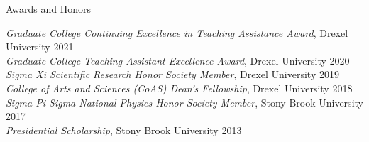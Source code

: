 \documentclass{resume} %
\begin{document}

\begin{rSection}{Awards and Honors}

\textit{Graduate College Continuing Excellence in Teaching Assistance Award}, Drexel University \hfill{2021} \\
\textit{Graduate College Teaching Assistant Excellence Award}, Drexel University \hfill{2020} \\
\textit{Sigma Xi Scientific Research Honor Society Member}, Drexel University \hfill{2019}\\
\textit{College of Arts and Sciences (CoAS) Dean's Fellowship}, Drexel University \hfill {2018}\\
\textit{Sigma Pi Sigma National Physics Honor Society Member}, Stony Brook University \hfill{2017}\\
\textit{Presidential Scholarship}, Stony Brook University \hfill {2013}

\end{rSection}

\end{document}
